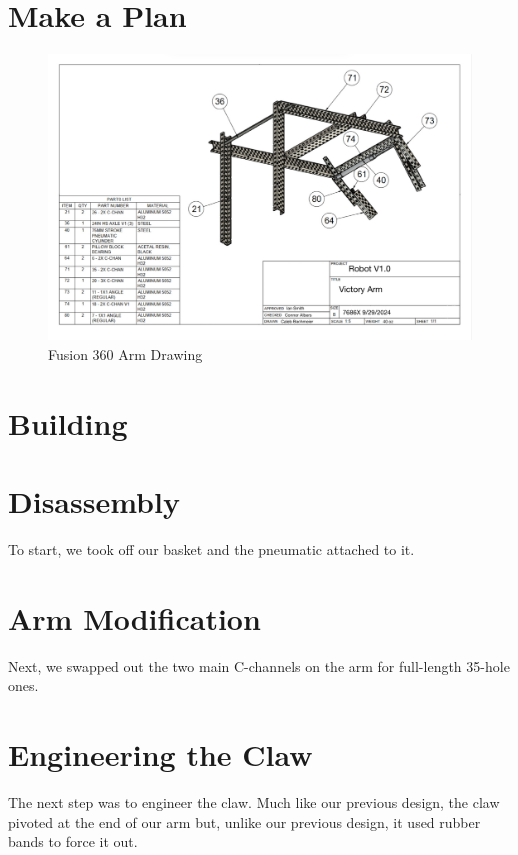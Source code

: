 \section*{Make a Plan}
\begin{figure}[H]
    \centering
    \includegraphics[width=1\linewidth]{images/Arm Drawing.jpg}
    \caption{Fusion 360 Arm Drawing}
    \label{fig:arm-drawing}
\end{figure}
\section*{Building}
\section*{Disassembly}
To start, we took off our basket and the pneumatic attached to it. 

\section*{Arm Modification}
Next, we swapped out the two main C-channels on the arm for full-length 35-hole ones.

\section*{Engineering the Claw}
The next step was to engineer the claw. Much like our previous design, the claw pivoted at the end of our arm but, unlike our previous design, it used rubber bands to force it out. 

